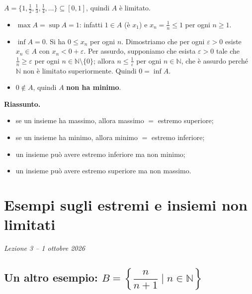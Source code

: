\documentclass[11pt,a4paper]{article}
\begin{document}
\begin{esempio}[$A = \{1/n \mid n \in \mathbb{N} \setminus \{0\}\}$]
$A = \{1, \frac12, \frac13, \frac14, \dots\} \subseteq [0, 1]$, quindi $A$ è
limitato.
\begin{itemize}
    \item $\max A = \sup A = 1$: infatti $1 \in A$ (è $x_1$) e
          $x_n = \frac1n \leq 1$ per ogni $n \geq 1$.
    \item $\inf A = 0$. Si ha $0 \leq x_n$ per ogni $n$. Dimostriamo che per
          ogni $\varepsilon > 0$ esiste $x_n \in A$ con $x_n < 0 + \varepsilon$.
          Per assurdo, supponiamo che esista $\varepsilon > 0$ tale che
          $\frac1n \geq \varepsilon$ per ogni $n \in \mathbb{N} \setminus \{0\}$;
          allora $n \leq \frac1\varepsilon$ per ogni $n \in \mathbb{N}$, che è
          assurdo perché $\mathbb{N}$ non è limitato superiormente. Quindi
          $0 = \inf A$.
    \item $0 \notin A$, quindi $A$ \textbf{non ha minimo}.
\end{itemize}
\end{esempio}

\textbf{Riassunto.}
\begin{itemize}
    \item se un insieme ha massimo, allora massimo $=$ estremo superiore;
    \item se un insieme ha minimo, allora minimo $=$ estremo inferiore;
    \item un insieme può avere estremo inferiore ma non minimo;
    \item un insieme può avere estremo superiore ma non massimo.
\end{itemize}

\section[Esempi sugli estremi e insiemi non limitati (Lezione 3 -- 1 ottobre 2026)]{Esempi sugli estremi e insiemi non limitati}
\noindent\emph{Lezione 3 -- 1 ottobre 2026}
\subsection{Un altro esempio: $B = \left\{ \dfrac{n}{n+1} \mid n \in \mathbb{N} \right\}$}
\end{document}
